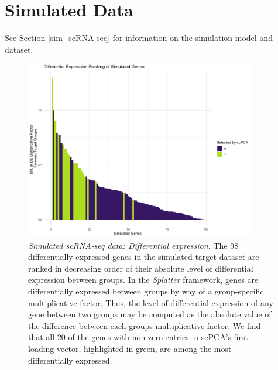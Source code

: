 \FloatBarrier

\section{Simulated Data}

See Section \ref{sim_scRNA-seq} for information on the simulation model and dataset.

\begin{figure}[!htbp]
    \centering
    \includegraphics[width=0.9\textwidth]{figures/sim_de_genes.png}
    \caption{{\em Simulated scRNA-seq data: Differential expression.}
    The 98 differentially expressed genes in the simulated target dataset are ranked in decreasing order of their absolute level of differential expression between groups. In the \textit{Splatter} framework, genes are differentially expressed between groups by way of a group-specific multiplicative factor. Thus, the level of differential expression of any gene between two groups may be computed as the absolute value of the difference between each groups multiplicative factor. We find that all 20 of the genes with non-zero entries in scPCA's first loading vector, highlighted in green, are among the most differentially expressed.}
    \label{fig:sim_de_genes}
\end{figure}

